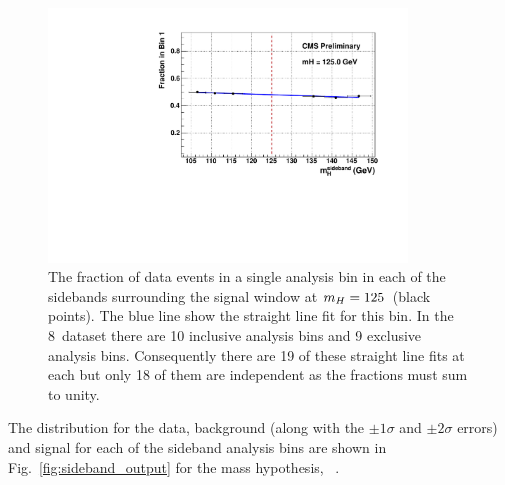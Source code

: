 \begin{figure}
  \begin{center}
    \includegraphics[width=0.85\textwidth]{analysis/plots/sideband/sideband_fit.pdf}
    \caption[An example of one of the sideband fits for the \acs{SMVA}]{The fraction of data events in a single analysis bin in each of the sidebands surrounding the signal window at $m_{H}=125$~\GeV (black points). The blue line show the straight line fit for this bin. In the 8~\TeV dataset there are 10 inclusive analysis bins and 9 exclusive analysis bins. Consequently there are 19 of these straight line fits at each \mH but only 18 of them are independent as the fractions must sum to unity.}
    \label{fig:sideband_shape}
  \end{center}
\end{figure}

The distribution for the data, background (along with the $\pm1\sigma$ and $\pm2\sigma$ errors) and signal for each of the sideband analysis bins are shown in Fig.~\ref{fig:sideband_output} for the mass hypothesis, ~\GeV.

